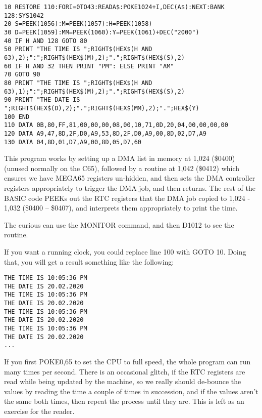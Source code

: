 \begin{tcolorbox}[colback=black,coltext=white]
\verbatimfont{\codefont}
\begin{verbatim}
10 RESTORE 110:FORI=0TO43:READA$:POKE1024+I,DEC(A$):NEXT:BANK 128:SYS1042
20 S=PEEK(1056):M=PEEK(1057):H=PEEK(1058)
30 D=PEEK(1059):MM=PEEK(1060):Y=PEEK(1061)+DEC("2000")
40 IF H AND 128 GOTO 80
50 PRINT "THE TIME IS ";RIGHT$(HEX$(H AND 63),2);":";RIGHT$(HEX$(M),2);".";RIGHT$(HEX$(S),2)
60 IF H AND 32 THEN PRINT "PM": ELSE PRINT "AM"
70 GOTO 90
80 PRINT "THE TIME IS ";RIGHT$(HEX$(H AND 63),1);":";RIGHT$(HEX$(M),2);".";RIGHT$(HEX$(S),2)
90 PRINT "THE DATE IS ";RIGHT$(HEX$(D),2);".";RIGHT$(HEX$(MM),2);".";HEX$(Y)
100 END
110 DATA 0B,80,FF,81,00,00,00,08,00,10,71,0D,20,04,00,00,00,00
120 DATA A9,47,8D,2F,D0,A9,53,8D,2F,D0,A9,00,8D,02,D7,A9
130 DATA 04,8D,01,D7,A9,00,8D,05,D7,60
\end{verbatim}
\end{tcolorbox}


This program works by setting up a DMA list in memory at 1,024 (\$0400) (unused normally on the C65), followed by a routine at 1,042 (\$0412) which ensures we have MEGA65 registers un-hidden, and then sets the DMA controller registers appropriately to trigger the DMA job, and then returns.  The rest of the BASIC code PEEKs out the RTC registers that the DMA job copied to 1,024 - 1,032 (\$0400 -- \$0407), and interprets them appropriately to print the time.

The curious can use the MONITOR command, and then D1012 to see the routine.

If you want a running clock, you could replace line 100 with GOTO 10.  Doing that, you will get a result something like the following:

\begin{tcolorbox}[colback=black,coltext=white]
\verbatimfont{\codefont}
\begin{verbatim}
THE TIME IS 10:05:36 PM
THE DATE IS 20.02.2020
THE TIME IS 10:05:36 PM
THE DATE IS 20.02.2020
THE TIME IS 10:05:36 PM
THE DATE IS 20.02.2020
THE TIME IS 10:05:36 PM
THE DATE IS 20.02.2020
...
\end{verbatim}
\end{tcolorbox}


If you first POKE0,65 to set the CPU to full speed, the whole program can run many times per second. There is an occasional glitch, if the RTC registers are read while being updated by the machine, so we really should de-bounce the values by reading the time a couple of times in succession, and if the values aren't the same both times, then repeat the process until they are. This is left as an exercise for the reader.

